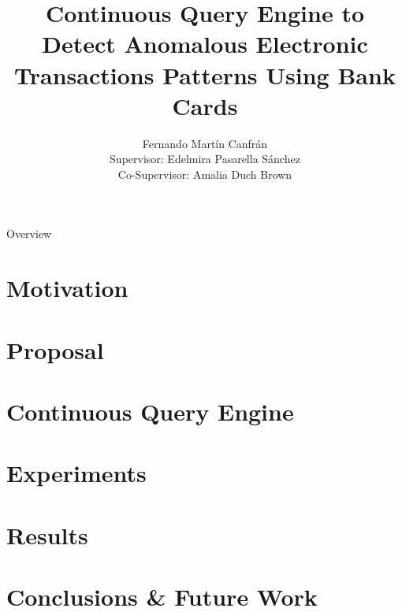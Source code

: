 \documentclass{beamer}
\title[CQE Anomalous ATM Transactions] %
{Continuous Query Engine to Detect Anomalous Electronic Transactions Patterns Using Bank Cards}
\author[F. Martín Canfrán] %
{Fernando Martín Canfrán\\[0.5cm] 
\small Supervisor: Edelmira Pasarella Sánchez\\
\small Co-Supervisor: Amalia Duch Brown}
\institute[UPC] %
{
  Facultat d'Informàtica de Barcelona\\
  Universitat Politècnica de Catalunya
}
\date[\monthyeardate\today] %
\begin{document}
\frame{\titlepage}

\begin{frame}{Overview}
  \tableofcontents
\end{frame}





\section{Motivation}


\section{Proposal}


\section{Continuous Query Engine}


\section{Experiments}


\section{Results}


\section{Conclusions \& Future Work}

\end{document}
